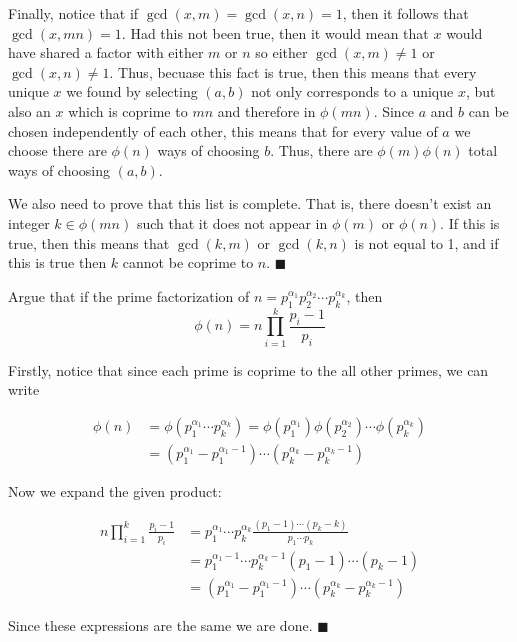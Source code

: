 \documentclass[11pt]{article}
\begin{document}
\begin{Parts}
\begin{solution}
      Finally, notice that if $\gcd(x, m) = \gcd(x, n) = 1$, then it follows that $\gcd(x, mn) = 1$. Had this not been true, then it would mean that $x$ would have shared a factor with either $m$ or $n$ so either $\gcd(x, m) \neq 1$ or $\gcd(x, n) \neq 1$. Thus, becuase this fact is true, then this means that every unique $x$ we found by selecting $(a, b)$ not only corresponds to a unique $x$, but also an $x$ which is coprime to $mn$ and therefore in $\phi(mn)$. Since $a$ and $b$ can be chosen independently of each other, this means that for every value of $a$ we choose there are $\phi(n)$ ways of choosing $b$. Thus, there are $\phi(m)\phi(n)$ total ways of choosing $(a, b)$.

      We also need to prove that this list is complete. That is, there doesn't exist an integer $k \in \phi(mn)$ such that it does not appear in $\phi(m)$ or $\phi(n)$. If this is true, then this means that $\gcd(k, m)$ or $\gcd(k, n)$ is not equal to 1, and if this is true then $k$ cannot be coprime to $n$. $\blacksquare$

    \end{solution}

    \Part Argue that if the prime factorization of $n = p_1^{\alpha_1} p_2^{\alpha_2} \cdots p_k^{\alpha_k}$, then
    \[ \phi(n) = n \prod_{i = 1}^k \frac{p_i - 1}{p_i} \]
    
    \begin{solution}
    Firstly, notice that since each prime is coprime to the all other primes, we can write 


    \begin{align*}
      \phi(n) &= \phi(p_1^{\alpha_1} \cdots p_k^{\alpha_k}) = \phi(p_1^{\alpha_1})\phi(p_2^{\alpha_2}) \cdots \phi(p_k^{\alpha_k})\\
      &= (p_1^{\alpha_1} - p_1^{\alpha_1 - 1}) \cdots (p_k^{\alpha_k} - p_k^{\alpha_k - 1})
    \end{align*}

    Now we expand the given product:

    \begin{align*}
      n\prod_{i = 1}^k \frac{p_i - 1}{p_i} &= p_1^{\alpha_1} \cdots p_k^{\alpha_k} \frac{(p_1 - 1) \cdots (p_k - k)}{p_1 \cdots p_k}\\
      &= p_1^{\alpha_1 - 1}\cdots p_k^{\alpha_k - 1}(p_1 - 1) \cdots (p_k - 1)\\
      &= (p_1^{\alpha_1} - p_1^{\alpha_1 - 1}) \cdots (p_k^{\alpha_k} - p_k^{\alpha_k - 1})
    \end{align*}

    Since these expressions are the same we are done. $\blacksquare$
  \end{solution}

  \end{Parts}
\end{document}
